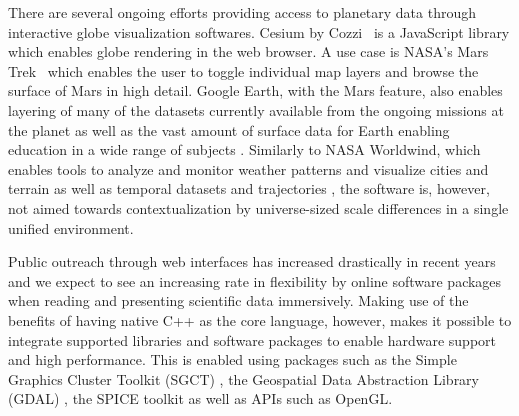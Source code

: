\documentclass[journal]{vgtc}                %
\newcommand{\kallecomment}[1]{\textbf{[-Kalle-~}
    \textcolor{orange}{#1}
    \textbf{~]}}
\newcommand{\plgrem}[1]{\textcolor{blue}{~\textbf{!!}~}}
\begin{document}
There are several ongoing efforts providing access to planetary data through interactive globe visualization softwares. Cesium by Cozzi~\cite{cozzi2013cesium} is a JavaScript library which enables globe rendering in the web browser.
A use case is NASA's Mars Trek~\cite{marstrek} which enables the user to toggle individual map layers and browse the surface of Mars in high detail.
Google Earth, with the Mars feature, also enables layering of many of the datasets currently available from the ongoing missions at the planet as well as the vast amount of surface data for Earth enabling education in a wide range of subjects \cite{patterson2007google}. Similarly to NASA Worldwind, which enables tools to analyze and monitor weather patterns and visualize cities and terrain as well as temporal datasets and trajectories \cite{hogan2006nasa}, the software is, however, not aimed towards contextualization by universe-sized scale differences in a single unified environment.


Public outreach through web interfaces has increased drastically in recent years and we expect to see an increasing rate in flexibility by online software packages when reading and presenting scientific data immersively.
Making use of the benefits of having native C++ as the core language, however, makes it possible to integrate supported libraries and software packages to enable hardware support and high performance. This is enabled using packages such as the Simple Graphics Cluster Toolkit (SGCT) \cite{sgct}, the Geospatial Data Abstraction Library (GDAL) \cite{warmerdam2008geospatial}, the SPICE toolkit \cite{acton1996ancillary} as well as APIs such as OpenGL.



\end{document}

